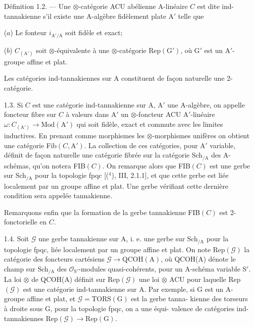 \documentclass[11pt]{article}
\newcommand{\scanpage}[1]{\par\bigskip\noindent{\small\sffamily[scan #1]}\par}
\newcommand{\mspage}[1]{{\small\sffamily[p.\,#1]}}
\newcommand{\hand}[1]{\textcolor{blue}{#1}}
\begin{document}
Définition 1.2. --- Une $\otimes$-catégorie ACU abélienne A-linéaire $C$ est
dite ind-tannakienne s'il existe une A-algèbre fidèlement plate A$'$ telle que

($a$) Le fonteur $i_{\mathrm{A}'/\mathrm{A}}$ soit fidèle et exact;

($b$) $C_{(\mathrm{A}')}$ soit $\otimes$-équivalente à une $\otimes$-catégorie $\mathrm{Rep}(\mathrm{G}')$, où G$'$ est un
A$'$-groupe affine et plat.

Les catégories ind-tannakiennes sur A constituent de façon naturelle
une 2-catégorie.

\mspage{\hand{73}}

\clearpage
\scanpage{119/74}
\mspage{( 2 )}

1.3. Si $C$ est une catégorie ind-tannakienne sur A, A$'$ une A-algèbre,
on appelle foncteur fibre sur $C$ à valeurs dans A$'$ un $\otimes$-foncteur ACU
A$'$-linéaire $\omega : C_{(\mathrm{A}')} \to \mathrm{Mod}(\mathrm{A}')$ qui soit fidèle, exact et commute avec les
limites inductives. En prenant comme morphismes les $\otimes$-morphismes
unifères on obtient une catégorie Fib$(C, \mathrm{A}')$. La collection de ces catégories,
pour A$'$ variable, définit de façon naturelle une catégorie fibrée sur la
catégorie Sch$_{/\mathrm{A}}$ des A-schémas, qu'on notera FIB$(C)$. On remarque alors
que FIB$(C)$ est une gerbe sur Sch$_{/\mathrm{A}}$ pour la topologie fpqc [(${}^{4}$), III, 2.1.1],
et que cette gerbe est liée localement par un groupe affine et plat. Une
gerbe vérifiant cette dernière condition sera appelée tannakienne.

Remarquons enfin que la formation de la gerbe tannakienne FIB$(C)$
est 2-fonctorielle en $C$.

1.4. Soit $\mathcal{G}$ une gerbe tannakienne sur A, i. e. une gerbe sur Sch$_{/\mathrm{A}}$
pour la topologie fpqc, liée localement par un groupe affine et plat. On note
Rep$(\mathcal{G})$ la catégorie des foncteurs cartésiens $\mathcal{G} \to \mathrm{QCOH}(\mathrm{A})$, où QCOH(A)
dénote le champ sur Sch$_{/\mathrm{A}}$ des $\mathcal{O}_{\mathrm{S}'}$-modules quasi-cohérents, pour un A-schéma
variable S$'$. La loi $\otimes$ de QCOH(A) définit sur Rep$(\mathcal{G})$ une loi $\otimes$ ACU pour
laquelle Rep$(\mathcal{G})$ est une catégorie ind-tannakienne sur A. Par exemple,
si G est un A-groupe affine et plat, et $\mathcal{G} = \mathrm{TORS}(\mathrm{G})$ est la gerbe tanna-%
kienne des torseurs à droite sous G, pour la topologie fpqc, on a une équi-%
valence de catégories ind-tannakiennes Rep$(\mathcal{G}) \to \mathrm{Rep}(\mathrm{G})$.
\end{document}
